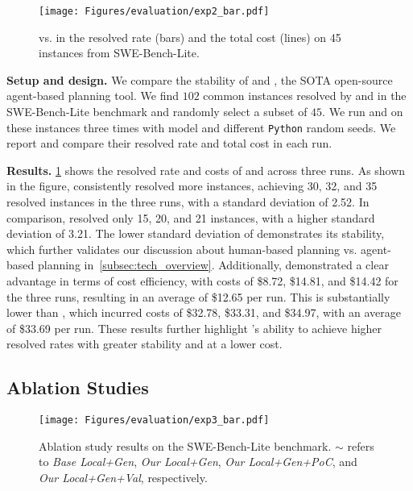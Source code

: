 \begin{figure}
    \centering
    \texttt{[image: Figures/evaluation/exp2\_bar.pdf]}
    \vspace{-4mm}
    \caption{\sys vs. \openhands in the resolved rate (bars) and the total cost (lines) on 45 instances from SWE-Bench-Lite.}
    \label{fig:stability_bar}
    \vspace{-4mm}
\end{figure}

\noindent\textbf{Setup and design.}
We compare the stability of \sys and \openhands, the SOTA open-source agent-based planning tool.
We find $102$ common instances resolved by \sys and \openhands in the SWE-Bench-Lite benchmark and randomly select a subset of $45$.
We run \sys and \openhands on these instances three times with \gpt model and different \texttt{Python} random seeds.
We report and compare their resolved rate and total cost in each run. 

\noindent\textbf{Results.}
\cref{fig:stability_bar} shows the resolved rate and costs of \sys and \openhands across three runs.
As shown in the figure, \sys consistently resolved more instances, achieving 30, 32, and 35 resolved instances in the three runs, with a standard deviation of 2.52.
In comparison, \openhands resolved only 15, 20, and 21 instances, with a higher standard deviation of 3.21.
The lower standard deviation of \sys demonstrates its stability, which further validates our discussion about human-based planning vs. agent-based planning in~\cref{subsec:tech_overview}.
Additionally, \sys demonstrated a clear advantage in terms of cost efficiency, with costs of \$8.72, \$14.81, and \$14.42 for the three runs, resulting in an average of \$12.65 per run. 
This is substantially lower than \openhands, which incurred costs of \$32.78, \$33.31, and \$34.97, with an average of \$33.69 per run. 
These results further highlight \sys's ability to achieve higher resolved rates with greater stability and at a lower cost.

\subsection{Ablation Studies}
\label{exp:ablation}

\begin{figure}
    \centering
    \texttt{[image: Figures/evaluation/exp3\_bar.pdf]}
    \vspace{-2mm}
    \caption{Ablation study results on the SWE-Bench-Lite benchmark. $\sim$ refers to \textit{Base Local+Gen}, \textit{Our Local+Gen}, \textit{Our Local+Gen+PoC}, and \textit{Our Local+Gen+Val}, respectively.}
    \label{fig:abliation_bar}
    \vspace{-4mm}
\end{figure}

